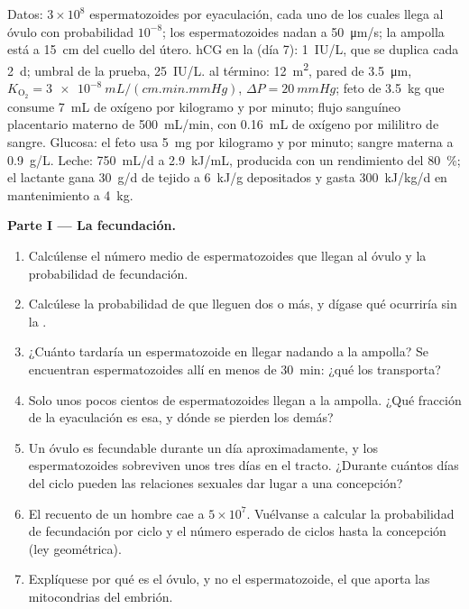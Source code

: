 \begin{problem}
\label{pb:b2:mammal-reproduction:1}
Datos: $3\times 10^{8}$ espermatozoides por eyaculación, cada uno de los
cuales llega al óvulo con probabilidad $10^{-8}$; los espermatozoides
nadan a \qty{50}{\micro m/s}; la ampolla está a \qty{15}{cm} del cuello
del útero. hCG en la  (día 7):
\qty{1}{IU/L}, que se duplica cada \qty{2}{d}; umbral de la prueba,
\qty{25}{IU/L}.  al término: \qty{12}{m^2}, pared de
\qty{3.5}{\micro m}, $K_{\mathrm{O_2}} = \qty{3e-8}{mL/(cm.min.mmHg)}$,
$\Delta P = \qty{20}{mmHg}$; feto de \qty{3.5}{kg} que consume
\qty{7}{mL} de oxígeno por kilogramo y por minuto; flujo sanguíneo
placentario materno de \qty{500}{mL/min}, con \qty{0.16}{mL} de oxígeno
por mililitro de sangre. Glucosa: el feto usa \qty{5}{mg} por kilogramo y
por minuto; sangre materna a \qty{0.9}{g/L}. Leche: \qty{750}{mL/d} a
\qty{2.9}{kJ/mL}, producida con un rendimiento del \qty{80}{\%}; el
lactante gana \qty{30}{g/d} de tejido a \qty{6}{kJ/g} depositados y gasta
\qty{300}{kJ/kg/d} en mantenimiento a \qty{4}{kg}.

\medskip
\noindent\textbf{Parte I --- La fecundación.}
\begin{enumerate}
  \item Calcúlense el número medio de espermatozoides que llegan al óvulo
        y la probabilidad de fecundación.
  \item Calcúlese la probabilidad de que lleguen dos o más, y dígase qué
        ocurriría sin la .
  \item ¿Cuánto tardaría un espermatozoide en llegar nadando a la
        ampolla? Se encuentran espermatozoides allí en menos de
        \qty{30}{min}: ¿qué los transporta?
  \item Solo unos pocos cientos de espermatozoides llegan a la ampolla.
        ¿Qué fracción de la eyaculación es esa, y dónde se pierden los
        demás?
  \item Un óvulo es fecundable durante un día aproximadamente, y los
        espermatozoides sobreviven unos tres días en el tracto. ¿Durante
        cuántos días del ciclo pueden las relaciones sexuales dar lugar a
        una concepción?
  \item El recuento de un hombre cae a $5\times 10^{7}$. Vuélvanse a
        calcular la probabilidad de fecundación por ciclo y el número
        esperado de ciclos hasta la concepción (ley geométrica).
  \item Explíquese por qué es el óvulo, y no el espermatozoide, el que
        aporta las mitocondrias del embrión.
\end{enumerate}


\end{problem}
